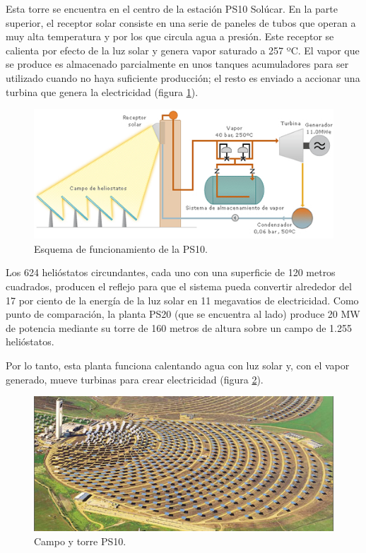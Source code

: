Esta torre se encuentra en el centro de la estación PS10 Solúcar. En la parte superior, el receptor solar consiste en una serie de paneles de tubos que operan a muy alta temperatura y por los que circula agua a presión. Este receptor se calienta por efecto de la luz solar y genera vapor saturado a 257 ºC. El vapor que se produce es almacenado parcialmente en unos tanques acumuladores para ser utilizado cuando no haya suficiente producción; el resto es enviado a accionar una turbina que genera la electricidad (figura \ref{fig:FotosPaginasWebHeliostatos/unnamed(7).jpg}).

\begin{figure}[h!]
  	\centering
	\includegraphics[width=\textwidth]{FotosPaginasWebHeliostatos/unnamed(7).jpg}
	\caption{Esquema de funcionamiento de la PS10.
	\label{fig:FotosPaginasWebHeliostatos/unnamed(7).jpg}}
\end{figure}

Los 624 helióstatos circundantes, cada uno con una superficie de 120 metros cuadrados, producen el reflejo para que el sistema pueda convertir alrededor del 17 por ciento de la energía de la luz solar en 11 megavatios de electricidad. Como punto de comparación, la planta PS20 (que se encuentra al lado) produce 20 MW de potencia mediante su torre de 160 metros de altura sobre un campo de 1.255 helióstatos.

Por lo tanto, esta planta funciona calentando agua con luz solar y, con el vapor generado, mueve turbinas para crear electricidad (figura \ref{fig:FotosPaginasWebHeliostatos/unnamed(6).jpg}).

\begin{figure}[h!]
  	\centering
	\includegraphics[width=\textwidth]{FotosPaginasWebHeliostatos/unnamed(6).jpg}
	\caption{Campo y torre PS10.
	\label{fig:FotosPaginasWebHeliostatos/unnamed(6).jpg}}
\end{figure}

